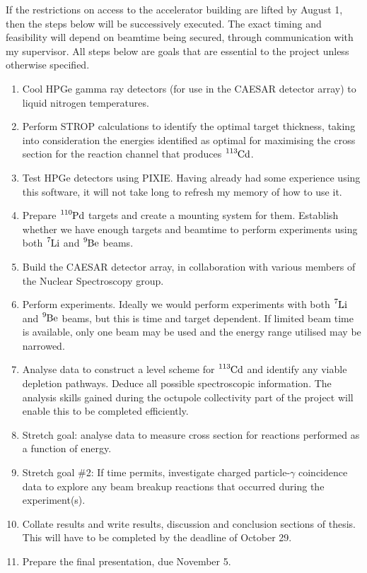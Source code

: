 \documentclass[12pt,a4paper]{article}
\begin{document}
\medskip
\noindent
If the restrictions on access to the accelerator building are lifted by August 1, then the steps below will be successively executed. The exact timing and feasibility will depend on beamtime being secured, through communication with my supervisor. All steps below are goals that are essential to the project unless otherwise specified.
\begin{enumerate}
\item Cool HPGe gamma ray detectors (for use in the CAESAR detector array) to liquid nitrogen temperatures.
\item Perform STROP calculations to identify the optimal target thickness, taking into consideration the energies identified as optimal for maximising the cross section for the reaction channel that produces $\ce{^{113}Cd}$.
\item Test HPGe detectors using PIXIE. Having already had some experience using this software, it will not take long to refresh my memory of how to use it.
\item Prepare $\ce{^{110}Pd}$ targets and create a mounting system for them. Establish whether we have enough targets and beamtime to perform experiments using both $\ce{^{7}Li}$ and $\ce{^{9}Be}$ beams.
\item Build the CAESAR detector array, in collaboration with various members of the Nuclear Spectroscopy group.
\item Perform experiments. Ideally we would perform experiments with both $\ce{^{7}Li}$ and $\ce{^{9}Be}$ beams, but this is time and target dependent. If limited beam time is available, only one beam may be used and the energy range utilised may be narrowed.
\item Analyse data to construct a level scheme for $\ce{^{113}Cd}$ and identify any viable depletion pathways.
Deduce all possible spectroscopic information.
The analysis skills gained during the octupole collectivity part of the project will enable this to be completed efficiently.
\item Stretch goal: analyse data to measure cross section for reactions performed as a function of energy.
\item Stretch goal \#2: If time permits, investigate charged particle-$\gamma$ coincidence data to explore any beam breakup reactions that occurred during the experiment(s).
\item Collate results and write results, discussion and conclusion sections of thesis. This will have to be completed by the deadline of October 29.
\item Prepare the final presentation, due November 5.
\end{enumerate}
\end{document}
